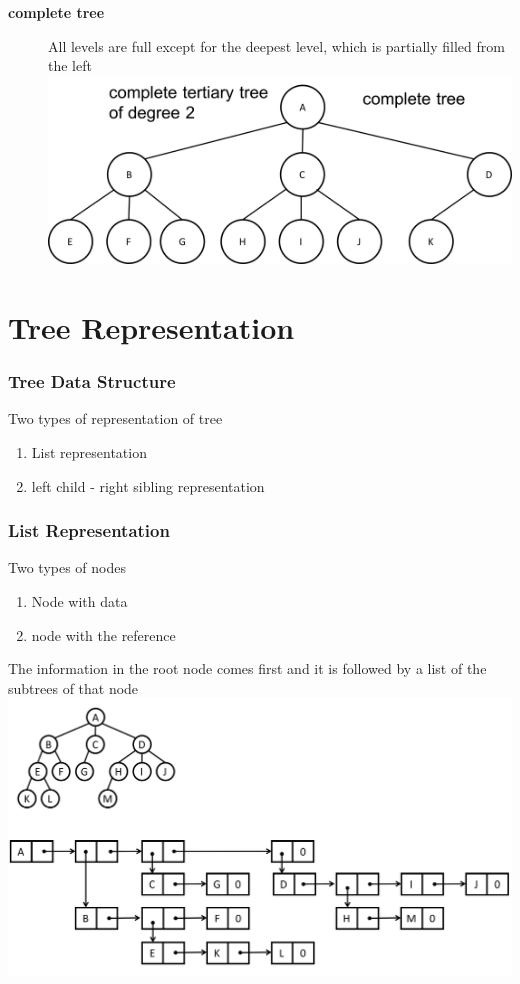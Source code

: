 \documentclass[newPxFont,sthlmFooter,nooffset]{beamer}
\begin{document}
\begin{frame}[t, allowframebreaks]
\begin{description}
\item[\textbf{complete tree}] All levels are full except for the deepest level, which is partially filled from the left\\
\includegraphics[height=0.3\textheight]{./figures/fig02_def_complete.png}
  \end{description}
\end{frame}

\section{Tree Representation}

\begin{frame}[t]
  \frametitle{Tree Data Structure}
Two types of representation of tree
  \begin{enumerate}
  \item List representation
  \item left child - right sibling representation
  \end{enumerate}
\end{frame}


\begin{frame}[t]
  \frametitle{List Representation}
Two types of nodes
  \begin{enumerate}
  \item Node with data
  \item node with the reference
  \end{enumerate}

The information in the root node comes first and it is followed by a list of the subtrees of that node
\includegraphics[height=0.6\textheight]{figures/fig03_list_rep.png}
\end{frame}
\end{document}
